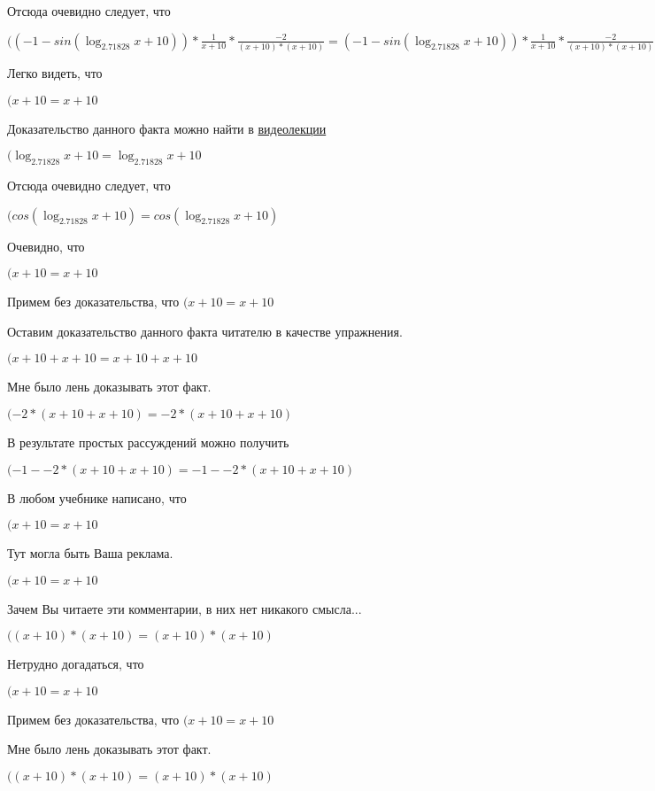 \documentclass[12pt,a4paper,fleqn]{article}
\theoremstyle{definition}
\begin{document}
Отсюда очевидно следует, что

$(( -1  - sin(\log_{ 2.71828 }{ x  +  10 })) * \frac{ 1 }{ x  +  10 }
 * \frac{ -2 }{( x  +  10 ) * ( x  +  10 )}
 = ( -1  - sin(\log_{ 2.71828 }{ x  +  10 })) * \frac{ 1 }{ x  +  10 }
 * \frac{ -2 }{( x  +  10 ) * ( x  +  10 )}
$

Легко видеть, что

$( x  +  10  =  x  +  10 $

Доказательство данного факта можно найти в \href{https://www.youtube.com/watch?v=dQw4w9WgXcQ}{видеолекции}

$(\log_{ 2.71828 }{ x  +  10 } = \log_{ 2.71828 }{ x  +  10 }$

Отсюда очевидно следует, что

$(cos(\log_{ 2.71828 }{ x  +  10 }) = cos(\log_{ 2.71828 }{ x  +  10 })$

Очевидно, что

$( x  +  10  =  x  +  10 $

Примем без доказательства, что
$( x  +  10  =  x  +  10 $

Оставим доказательство данного факта читателю в качестве упражнения.

$( x  +  10  +  x  +  10  =  x  +  10  +  x  +  10 $

Мне было лень доказывать этот факт.

$( -2  * ( x  +  10  +  x  +  10 ) =  -2  * ( x  +  10  +  x  +  10 )$

В результате простых рассуждений можно получить

$( -1  -  -2  * ( x  +  10  +  x  +  10 ) =  -1  -  -2  * ( x  +  10  +  x  +  10 )$

В любом учебнике написано, что

$( x  +  10  =  x  +  10 $

Тут могла быть Ваша реклама.

$( x  +  10  =  x  +  10 $

Зачем Вы читаете эти комментарии, в них нет никакого смысла...

$(( x  +  10 ) * ( x  +  10 ) = ( x  +  10 ) * ( x  +  10 )$

Нетрудно догадаться, что

$( x  +  10  =  x  +  10 $

Примем без доказательства, что
$( x  +  10  =  x  +  10 $

Мне было лень доказывать этот факт.

$(( x  +  10 ) * ( x  +  10 ) = ( x  +  10 ) * ( x  +  10 )$
\end{document}
